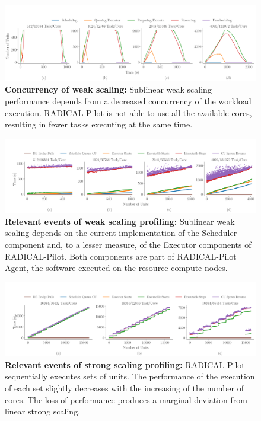 \documentclass{article}
\begin{document}
\begin{figure}
  \centering
  \includegraphics[width=\textwidth]{figures/screen_titan_rp_synapse_weak_scaling_concurrency_horizontal.png}
  \caption{\textbf{Concurrency of weak scaling:} Sublinear weak scaling
  performance depends from a decreased concurrency of the workload execution.
  RADICAL-Pilot is not able to use all the available cores, resulting in
  fewer tasks executing at the same time.}\label{fig:ws-concurrency}
\end{figure}

\begin{figure}
  \centering
  \includegraphics[width=\textwidth]{figures/screen_titan_rp_synapse_weak_scaling_events_timeline_horizontal.png}
  \caption{\textbf{Relevant events of weak scaling profiling:} Sublinear weak
	scaling depends on the current implementation of the Scheduler component
	and, to a lesser measure, of the Executor components of RADICAL-Pilot.
	Both components are part of RADICAL-Pilot Agent, the software executed on
	the resource compute nodes. }\label{fig:ws-events}
\end{figure}

\begin{figure}
  \centering
  \includegraphics[width=\textwidth]{figures/screen_titan_rp_synapse_strong_scaling_events_timeline_horizontal.png}
  \caption{\textbf{Relevant events of strong scaling profiling:}
  RADICAL-Pilot sequentially executes sets of units. The performance of the
  execution of each set slightly decreases with the increasing of the number
  of cores. The loss of performance produces a marginal deviation from linear
  strong scaling.}\label{fig:ss-events}
\end{figure}
\end{document}

